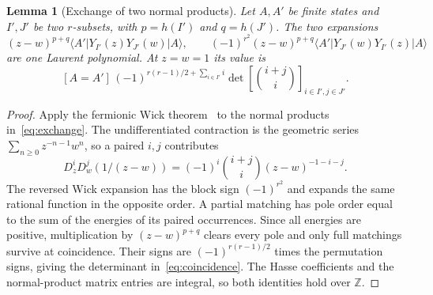 \documentclass[11pt]{article}
\newtheorem{lemma}[theorem]{Lemma}
\theoremstyle{remark}
\begin{document}
\begin{lemma}[Exchange of two normal products]\label{exchange}
Let \(A,A'\) be finite states and \(I',J'\) be two \(r\)-subsets, with \(p=h(I')\) and \(q=h(J')\). The two expansions
\begin{equation}\label{eq:exchange}
 (z-w)^{p+q}\langle A'|Y_{I'}(z)Y_{J'}(w)|A\rangle,\qquad
 (-1)^{r^2}(z-w)^{p+q}\langle A'|Y_{J'}(w)Y_{I'}(z)|A\rangle
\end{equation}
are one Laurent polynomial. At \(z=w=1\) its value is
\begin{equation}\label{eq:coincidence}
 [A=A']\,(-1)^{r(r-1)/2+\sum_{i\in I'}i}
          \det\!\left[\binom{i+j}{i}\right]_{i\in I',j\in J'} .
\end{equation}
\end{lemma}
\begin{proof}
Apply the fermionic Wick theorem~\cite{wick} to the normal products in~\eqref{eq:exchange}. The undifferentiated contraction is the geometric series \(\sum_{n\ge0}z^{-n-1}w^n\), so a paired \(i,j\) contributes
\[
 D_z^i D_w^j(1/(z-w))=(-1)^i\binom{i+j}{i}(z-w)^{-1-i-j}.
\]
The reversed Wick expansion has the block sign \((-1)^{r^2}\) and expands the same rational function in the opposite order. A partial matching has pole order equal to the sum of the energies of its paired occurrences. Since all energies are positive, multiplication by \((z-w)^{p+q}\) clears every pole and only full matchings survive at coincidence. Their signs are \((-1)^{r(r-1)/2}\) times the permutation signs, giving the determinant in~\eqref{eq:coincidence}. The Hasse coefficients and the normal-product matrix entries are integral, so both identities hold over \(\mathbb Z\).
\end{proof}
\end{document}
